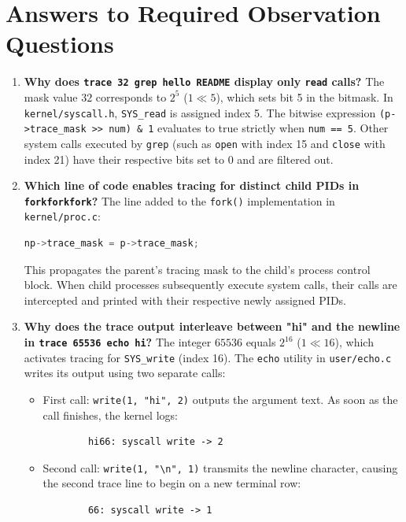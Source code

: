 \documentclass[12pt,a4paper]{report}
\numberwithin{equation}{chapter}
\numberwithin{figure}{chapter}
\numberwithin{table}{chapter}
\begin{document}
\section{Answers to Required Observation Questions}
\begin{enumerate}
    \item \textbf{Why does \texttt{trace 32 grep hello README} display only \texttt{read} calls?}  
    The mask value $32$ corresponds to $2^5$ ($1 \ll 5$), which sets bit 5 in the bitmask. In \texttt{kernel/syscall.h}, \texttt{SYS\_read} is assigned index 5. The bitwise expression \texttt{(p->trace\_mask >> num) \& 1} evaluates to true strictly when \texttt{num == 5}. Other system calls executed by \texttt{grep} (such as \texttt{open} with index 15 and \texttt{close} with index 21) have their respective bits set to 0 and are filtered out.

    \item \textbf{Which line of code enables tracing for distinct child PIDs in \texttt{forkforkfork}?}  
    The line added to the \texttt{fork()} implementation in \texttt{kernel/proc.c}:
    \begin{lstlisting}[language=C]
    np->trace_mask = p->trace_mask;
    \end{lstlisting}
    This propagates the parent's tracing mask to the child's process control block. When child processes subsequently execute system calls, their calls are intercepted and printed with their respective newly assigned PIDs.

    \item \textbf{Why does the trace output interleave between "hi" and the newline in \texttt{trace 65536 echo hi}?}  
    The integer $65536$ equals $2^{16}$ ($1 \ll 16$), which activates tracing for \texttt{SYS\_write} (index 16). The \texttt{echo} utility in \texttt{user/echo.c} writes its output using two separate calls:
    \begin{itemize}
        \item First call: \texttt{write(1, "hi", 2)} outputs the argument text. As soon as the call finishes, the kernel logs:
        \begin{lstlisting}
        hi66: syscall write -> 2
        \end{lstlisting}
        \item Second call: \texttt{write(1, "\textbackslash n", 1)} transmits the newline character, causing the second trace line to begin on a new terminal row:
        \begin{lstlisting}
        66: syscall write -> 1
        \end{lstlisting}
    \end{itemize}


\end{enumerate}
\end{document}
